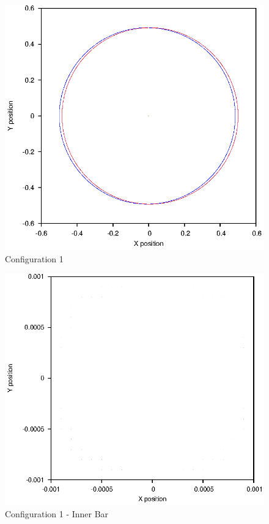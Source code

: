 \documentclass[a4paper,12pt]{article}
\begin{document}
\begin{figure}[H]
\centering
\includegraphics[width=.9\textwidth]{./2016results/stablebase/Orbit.eps}
\caption{Configuration 1}
\label{fig:config1}
\end{figure}

\begin{figure}[H]
\centering
\includegraphics[width=.9\textwidth]{./2016results/stablebase/Inner.eps}
\caption{Configuration 1 - Inner Bar}
\label{fig:config1i}
\end{figure}
\end{document}
